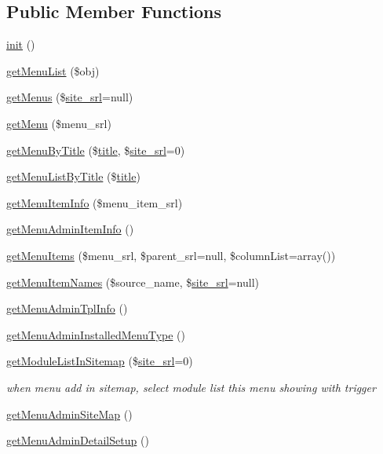 \subsection*{Public Member Functions}
\begin{DoxyCompactItemize}
\item 
\hyperlink{classmenuAdminModel_a092a0da21ac0c7f76f84ec5be5eea1b7}{init} ()
\item 
\hyperlink{classmenuAdminModel_ad1a73e97dedf1b78f6780e4c17ff5100}{get\-Menu\-List} (\$obj)
\item 
\hyperlink{classmenuAdminModel_a78dfe866b68c04fd622df4d41bdce36c}{get\-Menus} (\$\hyperlink{ko_8install_8php_a8b1406b4ad1048041558dce6bfe89004}{site\-\_\-srl}=null)
\item 
\hyperlink{classmenuAdminModel_a303e32a7d98c99847035407e7ed4e951}{get\-Menu} (\$menu\-\_\-srl)
\item 
\hyperlink{classmenuAdminModel_a358509545ff88093b02be04c6599796d}{get\-Menu\-By\-Title} (\$\hyperlink{ko_8install_8php_a5b072c5fd1d2228c6ba5cee13cd142e3}{title}, \$\hyperlink{ko_8install_8php_a8b1406b4ad1048041558dce6bfe89004}{site\-\_\-srl}=0)
\item 
\hyperlink{classmenuAdminModel_a0639cb89b3292dc5ee8977423b5ac140}{get\-Menu\-List\-By\-Title} (\$\hyperlink{ko_8install_8php_a5b072c5fd1d2228c6ba5cee13cd142e3}{title})
\item 
\hyperlink{classmenuAdminModel_a5686120035966f9a44ec2fea2af191e4}{get\-Menu\-Item\-Info} (\$menu\-\_\-item\-\_\-srl)
\item 
\hyperlink{classmenuAdminModel_a12a02d8f3441f1454fe22e5b8d927de5}{get\-Menu\-Admin\-Item\-Info} ()
\item 
\hyperlink{classmenuAdminModel_a2a663607f4ded1cf71df28271ac72888}{get\-Menu\-Items} (\$menu\-\_\-srl, \$parent\-\_\-srl=null, \$column\-List=array())
\item 
\hyperlink{classmenuAdminModel_a3a77c5cfe6cee8b008b5b960adb83d9e}{get\-Menu\-Item\-Names} (\$source\-\_\-name, \$\hyperlink{ko_8install_8php_a8b1406b4ad1048041558dce6bfe89004}{site\-\_\-srl}=null)
\item 
\hyperlink{classmenuAdminModel_a9f938b72f1488559cab19e9011ae7076}{get\-Menu\-Admin\-Tpl\-Info} ()
\item 
\hyperlink{classmenuAdminModel_a1fd1ae309603a0fc0b58589d2cc0d025}{get\-Menu\-Admin\-Installed\-Menu\-Type} ()
\item 
\hyperlink{classmenuAdminModel_a20137764f7bc81d8413f7adc0518d895}{get\-Module\-List\-In\-Sitemap} (\$\hyperlink{ko_8install_8php_a8b1406b4ad1048041558dce6bfe89004}{site\-\_\-srl}=0)
\begin{DoxyCompactList}\small\item\em when menu add in sitemap, select module list this menu showing with trigger \end{DoxyCompactList}\item 
\hyperlink{classmenuAdminModel_adaae66f6de001bdaa33b72bcc83a6747}{get\-Menu\-Admin\-Site\-Map} ()
\item 
\hyperlink{classmenuAdminModel_ac55866233401318f5c9c2529a924c06b}{get\-Menu\-Admin\-Detail\-Setup} ()
\end{DoxyCompactItemize}
